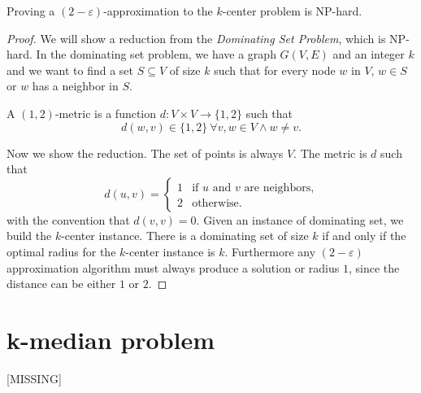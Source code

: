 \begin{thm}
	Proving a $(2-\varepsilon)$-approximation to the $k$-center problem is NP-hard.
\end{thm}
\begin{proof}
	We will show a reduction from the \emph{Dominating Set Problem}, which is NP-hard. In the dominating set problem, we have a graph $G(V, E)$ and an integer $k$ and we want to find a set $S \subseteq V$ of size $k$ such that for every node  $w$ in $V$, $w \in S$ or $w$ has a neighbor in $S$.
	
	\begin{defn}[$(1,2)$-metric]
		A $(1,2)$-metric is a function $d:V\times V \rightarrow \{1, 2\}$ such that 
		$$d(w, v) \in \{1, 2\}\ \forall v, w \in V \wedge w \neq v.$$
	\end{defn}
	
	Now we show the reduction. The set of points is always $V$. The metric is $d$ such that
	\begin{equation}
		d(u, v) = \begin{cases}
		1 & \text{if $u$ and $v$ are neighbors,}\\
		2 & \text{otherwise.}
		\end{cases}
	\end{equation}
with the convention that $d(v, v) = 0$. Given an instance of dominating set, we build the $k$-center instance. There is a dominating set of size $k$ if and only if the optimal radius for the $k$-center instance is $k$. Furthermore any $(2 -\varepsilon)$ approximation algorithm must always produce a solution or radius $1$, since the distance can be either $1$ or $2$.
\end{proof}

\section{k-median problem}
[MISSING]
